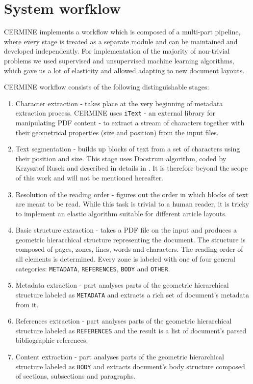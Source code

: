 \chapter{System worfklow}\label{chapter:system_workflow}

CERMINE implements a workflow which is composed of a multi-part pipeline, where every stage is treated as a separate module and can be maintained and developed independently. For implementation of the majority of non-trivial problems we used supervised and unsupervised machine learning algorithms, which gave us a lot of elasticity and allowed adapting to new document layouts.

CERMINE workflow consists of the following distinguishable stages:
\begin{enumerate}
    \item {Character extraction} - takes place at the very beginning of metadata extraction process. CERMINE uses \verb+iText+ - an external library for manipulating PDF content - to extract a stream of characters together with their geometrical properties (size and position) from the input files.
    \item {Text segmentation} - builds up blocks of text from a set of characters using their position and size. This stage uses Docstrum algorithm, coded by Krzysztof Rusek and described in details in \cite{O'Gorman1993}. It is therefore beyond the scope of this work and will not be mentioned hereafter.
    \item {Resolution of the reading order} - figures out the order in which blocks of text are meant to be read. While this task is trivial to a human reader, it is tricky to implement an elastic algorithm suitable for different article layouts.
    \item {Basic structure extraction} - takes a PDF file on the input and produces a geometric hierarchical structure representing the document. The structure is composed of pages, zones, lines, words and characters. The reading order of all elements is determined. Every zone is labeled with one of four general categories: \verb+METADATA+, \verb+REFERENCES+, \verb+BODY+ and \verb+OTHER+.
    \item {Metadata extraction} - part analyses parts of the geometric hierarchical structure labeled as \verb+METADATA+ and extracts a rich set of document's metadata from it.
    \item {References extraction} - part analyses parts of the geometric hierarchical structure labeled as \verb+REFERENCES+ and the result is a list of document's parsed bibliographic references.
    \item {Content extraction} - part analyses parts of the geometric hierarchical structure labeled as \verb+BODY+ and extracts document's body structure composed of sections, subsections and paragraphs. 
\end{enumerate}
